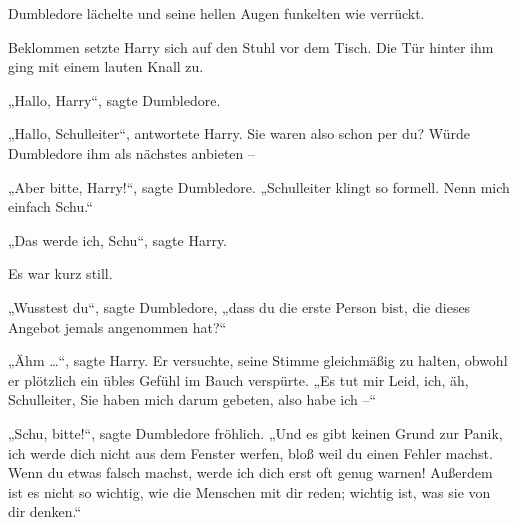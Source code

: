 Dumbledore lächelte und seine hellen Augen funkelten wie verrückt.

Beklommen setzte Harry sich auf den Stuhl vor dem Tisch. Die Tür hinter ihm ging mit einem lauten Knall zu.

„Hallo, Harry“, sagte Dumbledore.

„Hallo, Schulleiter“, antwortete Harry. Sie waren also schon per du? Würde Dumbledore ihm als nächstes anbieten –

„Aber bitte, Harry!“, sagte Dumbledore. „Schulleiter klingt so formell. Nenn mich einfach Schu.“

„Das werde ich, Schu“, sagte Harry.

Es war kurz still.

„Wusstest du“, sagte Dumbledore, „dass du die erste Person bist, die dieses Angebot jemals angenommen hat?“

„Ähm …“, sagte Harry. Er versuchte, seine Stimme gleichmäßig zu halten, obwohl er plötzlich ein übles Gefühl im Bauch verspürte. „Es tut mir Leid, ich, äh, Schulleiter, Sie haben mich darum gebeten, also habe ich –“

„Schu, bitte!“, sagte Dumbledore fröhlich. „Und es gibt keinen Grund zur Panik, ich werde dich nicht aus dem Fenster werfen, bloß weil du einen Fehler machst. Wenn du etwas falsch machst, werde ich dich erst oft genug warnen! Außerdem ist es nicht so wichtig, wie die Menschen mit dir reden; wichtig ist, was sie von dir denken.“

